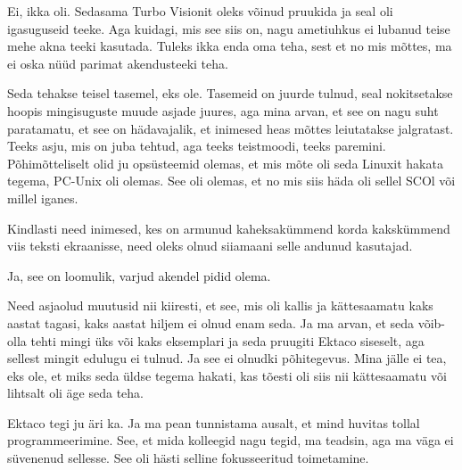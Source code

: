 
Ei, ikka oli. Sedasama Turbo Visionit oleks võinud pruukida ja seal oli 
igasuguseid teeke. Aga kuidagi, mis see siis on, nagu ametiuhkus ei lubanud 
teise mehe akna teeki kasutada. Tuleks ikka enda oma teha, sest et no mis 
mõttes, ma ei oska nüüd parimat akendusteeki teha. 


Seda tehakse teisel tasemel, eks ole. Tasemeid on juurde tulnud, seal 
nokitsetakse hoopis mingisuguste muude asjade juures, aga mina arvan, et see on 
nagu suht paratamatu, et see on hädavajalik, et inimesed heas mõttes 
leiutatakse jalgratast. Teeks asju, mis on juba tehtud, aga teeks teistmoodi, 
teeks paremini. Põhimõtteliselt olid ju opsüsteemid olemas, et mis mõte oli 
seda Linuxit hakata tegema, PC-Unix oli olemas. See oli olemas, et no mis siis 
häda oli sellel SCOl või millel iganes. 



Kindlasti need inimesed, kes on armunud kaheksakümmend korda kakskümmend viis 
teksti ekraanisse, need oleks olnud siiamaani selle andunud kasutajad. 


Ja, see on loomulik, varjud akendel pidid olema.


Need asjaolud muutusid nii kiiresti, et see, mis oli kallis ja kättesaamatu 
kaks aastat tagasi,  kaks aastat hiljem ei olnud enam seda. Ja ma arvan, et 
seda võib-olla tehti mingi üks või kaks eksemplari ja seda pruugiti Ektaco 
siseselt, aga sellest mingit edulugu ei tulnud. Ja see ei olnudki põhitegevus. 
Mina jälle ei tea, eks ole, et miks seda üldse tegema hakati, kas tõesti oli 
siis nii kättesaamatu või lihtsalt oli äge seda teha.  


Ektaco tegi ju  äri ka. Ja ma pean tunnistama ausalt, et  mind huvitas tollal 
programmeerimine. See, et mida  kolleegid nagu tegid, ma teadsin, aga ma väga 
ei süvenenud sellesse. See oli hästi selline fokusseeritud toimetamine.


